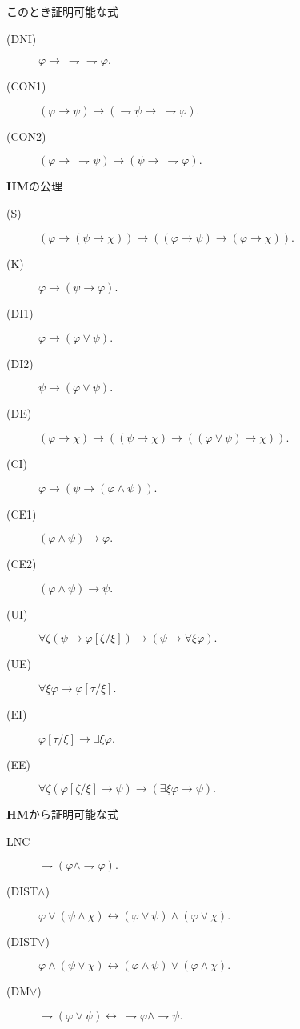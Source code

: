 	このとき証明可能な式
	\begin{description}
		\item[(DNI)] $\varphi \rightarrow\ \rightharpoondown \rightharpoondown \varphi.$
		\item[(CON1)] $(\varphi \rightarrow \psi) \rightarrow (\rightharpoondown \psi \rightarrow\ \rightharpoondown \varphi).$
		\item[(CON2)] $(\varphi \rightarrow\ \rightharpoondown \psi) \rightarrow (\psi \rightarrow\ \rightharpoondown \varphi).$
	\end{description}
	
	\begin{itembox}[l]{{\bf HM}の公理}
		\begin{description}
			\item[(S)] $(\varphi \rightarrow (\psi \rightarrow \chi)) 
				\rightarrow ((\varphi \rightarrow \psi)
				\rightarrow (\varphi \rightarrow \chi)).$
			\item[(K)] $\varphi \rightarrow (\psi \rightarrow \varphi).$
			\item[(DI1)] $\varphi \rightarrow (\varphi \vee \psi).$
			\item[(DI2)] $\psi \rightarrow (\varphi \vee \psi).$
			\item[(DE)] $(\varphi \rightarrow \chi) \rightarrow 
				((\psi \rightarrow \chi) \rightarrow ((\varphi \vee \psi) \rightarrow \chi)).$
			\item[(CI)] $\varphi \rightarrow (\psi \rightarrow (\varphi \wedge \psi)).$
			\item[(CE1)] $(\varphi \wedge \psi) \rightarrow \varphi.$
			\item[(CE2)] $(\varphi \wedge \psi) \rightarrow \psi.$
			\item[(UI)] $\forall \zeta (\psi \rightarrow \varphi[\zeta/\xi]) 
				\rightarrow (\psi \rightarrow \forall \xi \varphi).$
			\item[(UE)] $\forall \xi \varphi \rightarrow \varphi[\tau/\xi].$
			\item[(EI)] $\varphi[\tau/\xi] \rightarrow \exists \xi \varphi.$
			\item[(EE)] $\forall \zeta (\varphi[\zeta/\xi] \rightarrow \psi)
				\rightarrow (\exists \xi \varphi \rightarrow \psi).$
		\end{description}
	\end{itembox}
	
	{\bf HM}から証明可能な式
	\begin{description}
		\item[LNC] $\rightharpoondown (\varphi \wedge \rightharpoondown \varphi).$
		\item[(DIST$\wedge$)] $\varphi \vee (\psi \wedge \chi) 
			\leftrightarrow (\varphi \vee \psi) \wedge (\varphi \vee \chi).$
		\item[(DIST$\vee$)] $\varphi \wedge (\psi \vee \chi) 
			\leftrightarrow (\varphi \wedge \psi) \vee (\varphi \wedge \chi).$
		\item[(DM$\vee$)] $\rightharpoondown (\varphi \vee \psi) \leftrightarrow
			\ \rightharpoondown \varphi \wedge \rightharpoondown \psi.$
	\end{description}
	

